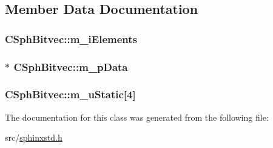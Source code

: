 \subsection{Member Data Documentation}
\hypertarget{classCSphBitvec_a7f964663c4896dfa70bc85ff68017515}{
\subsubsection[{m\-\_\-i\-Elements}]{ C\-Sph\-Bitvec\-::m\-\_\-i\-Elements\hspace{0.3cm}{\ttfamily [protected]}}}\label{classCSphBitvec_a7f964663c4896dfa70bc85ff68017515}
\hypertarget{classCSphBitvec_a0f3d79323dd87e74dcd8b09edf3f30fe}{
\subsubsection[{m\-\_\-p\-Data}]{$\ast$ C\-Sph\-Bitvec\-::m\-\_\-p\-Data\hspace{0.3cm}{\ttfamily [protected]}}}\label{classCSphBitvec_a0f3d79323dd87e74dcd8b09edf3f30fe}
\hypertarget{classCSphBitvec_ac70b5fec98f2067a35cbade1b7518457}{
\subsubsection[{m\-\_\-u\-Static}]{ C\-Sph\-Bitvec\-::m\-\_\-u\-Static\mbox{[}4\mbox{]}\hspace{0.3cm}{\ttfamily [protected]}}}\label{classCSphBitvec_ac70b5fec98f2067a35cbade1b7518457}


The documentation for this class was generated from the following file\-:\begin{DoxyCompactItemize}
\item 
src/\hyperlink{sphinxstd_8h}{sphinxstd.\-h}\end{DoxyCompactItemize}
